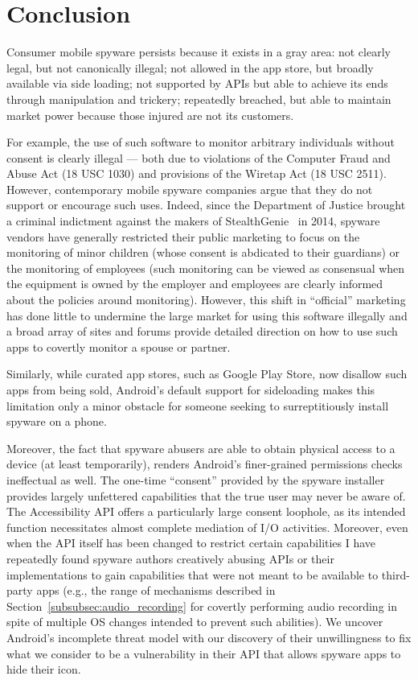 \section{Conclusion}
Consumer mobile spyware persists because it exists in a gray area: not
clearly legal, but not canonically illegal; not allowed in the app
store, but broadly available via side loading; not supported by APIs
but able to achieve its ends through manipulation and trickery;
repeatedly breached, but able to maintain market power because those
injured are not its customers.

For example, the use of such software to monitor arbitrary individuals
without consent is clearly illegal --- both due to violations of the
Computer Fraud and Abuse Act (18 USC 1030) and provisions of the
Wiretap Act (18 USC 2511).  However, contemporary mobile spyware
companies argue that they do not support or encourage such uses.
Indeed, since the Department of Justice brought a criminal indictment
against the makers of StealthGenie~\cite{dojstealthgenie} in 2014,
spyware vendors have generally restricted their public marketing to
focus on the monitoring of minor children (whose consent is abdicated
to their guardians) or the monitoring of employees (such monitoring
can be viewed as consensual when the equipment is owned by the
employer and employees are clearly informed about the policies around
monitoring).  However, this shift in ``official'' marketing has done
little to undermine the large market for using this software illegally
and a broad array of sites and forums provide detailed direction on
how to use such apps to covertly monitor a spouse or partner.

Similarly, while curated app stores, such as Google Play Store, now
disallow such apps from being sold, Android's default support for
sideloading makes this limitation only a minor obstacle for someone
seeking to surreptitiously install spyware on a
phone.

Moreover, the fact that spyware abusers are able to obtain physical
access to a device (at least temporarily), renders Android's
finer-grained permissions checks ineffectual as well.  The one-time
``consent'' provided by the spyware installer provides largely
unfettered capabilities that the true user may never be aware of.  The
Accessibility API offers a particularly large consent loophole, as its
intended function necessitates almost complete mediation of I/O
activities.  Moreover, even when the API itself has been changed to
restrict certain capabilities I have repeatedly found spyware authors
creatively abusing APIs or their implementations to gain capabilities
that were not meant to be available to third-party apps
(e.g., the range of mechanisms described in
Section~\ref{subsubsec:audio_recording} for covertly performing audio
recording in spite of multiple OS changes intended to prevent such
abilities). We uncover Android's incomplete threat model
with our discovery of their unwillingness to fix what
we consider to be a vulnerability in their API that allows spyware apps to
hide their icon.

